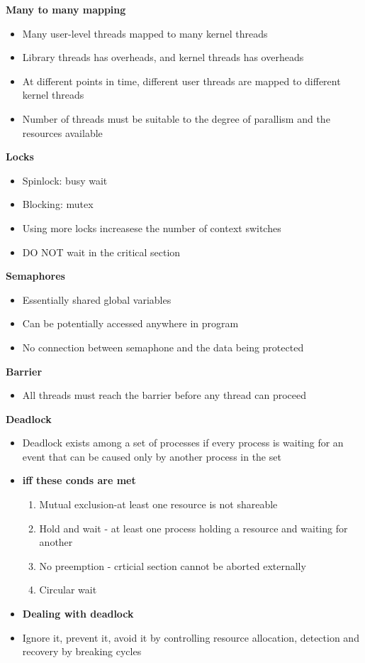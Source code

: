 \documentclass[10pt, landscape]{article}
\begin{document}
\begin{multicols}{4}
\textbf{Many to many mapping}
\begin{itemize}
    \item Many user-level threads mapped to many kernel threads
    \item Library threads has overheads, and kernel threads has overheads
    \item At different points in time, different user threads are mapped to different kernel threads
    \item Number of threads must be suitable to the degree of parallism and the resources available
\end{itemize}

\textbf{Locks}
\begin{itemize}
    \item Spinlock: busy wait 
    \item Blocking: mutex 
    \item Using more locks increasese the number of context switches 
    \item DO NOT wait in the critical section
\end{itemize}

\textbf{Semaphores}
\begin{itemize}
    \item Essentially shared global variables 
    \item Can be potentially accessed anywhere in program 
    \item No connection between semaphone and the data being protected 
\end{itemize}

\textbf{Barrier}
\begin{itemize}
    \item All threads must reach the barrier before any thread can proceed
\end{itemize}

\textbf{Deadlock}
\begin{itemize}
    \item Deadlock exists among a set of processes if every process is waiting for an event that can be caused only by another process in the set
    \item \textbf{iff these conds are met}
    \begin{enumerate}
        \item Mutual exclusion-at least one resource is not shareable 
        \item Hold and wait - at least one process holding a resource and waiting for another 
        \item No preemption - crticial section cannot be aborted externally 
        \item Circular wait
    \end{enumerate}
    \item \textbf{Dealing with deadlock}
    \item Ignore it, prevent it, avoid it by controlling resource allocation, detection and recovery by breaking cycles
\end{itemize}


\end{multicols}
\end{document}
